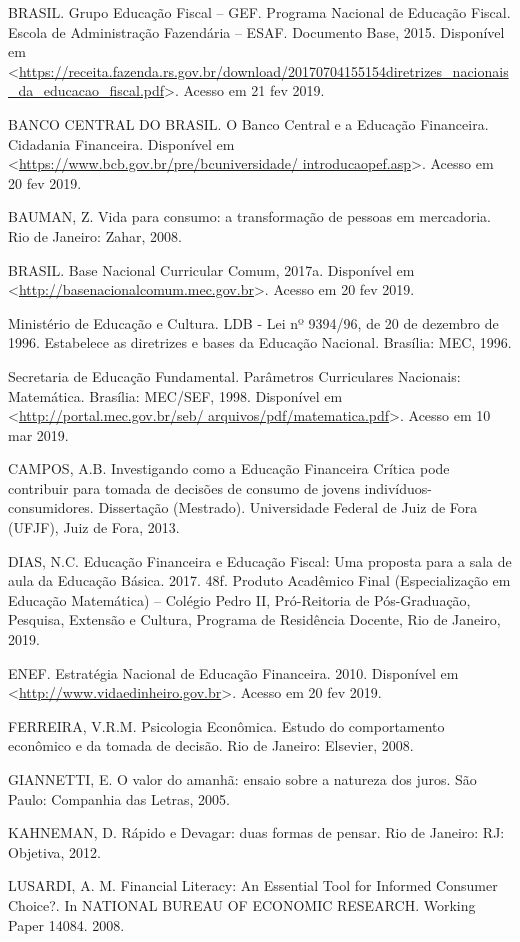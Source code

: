 BRASIL. Grupo Educação Fiscal – GEF. Programa Nacional de Educação Fiscal. Escola de Administração Fazendária – ESAF. Documento Base, 2015. Disponível em <\url{https://receita.fazenda.rs.gov.br/download/20170704155154diretrizes_nacionais_da_educacao_fiscal.pdf}>. Acesso em 21 fev 2019.

BANCO CENTRAL DO BRASIL. O Banco Central e a Educação Financeira. Cidadania Financeira. Disponível em <\url{https://www.bcb.gov.br/pre/bcuniversidade/ introducaopef.asp}>. Acesso em 20 fev 2019.

BAUMAN, Z. Vida para consumo: a transformação de pessoas em mercadoria. Rio de Janeiro: Zahar, 2008.

BRASIL. Base Nacional Curricular Comum, 2017a. Disponível em <\url{http://basenacionalcomum.mec.gov.br}>. Acesso em 20 fev 2019.

Ministério de Educação e Cultura. LDB - Lei nº 9394/96, de 20 de dezembro de 1996. Estabelece as diretrizes e bases da Educação Nacional. Brasília: MEC, 1996.

Secretaria de Educação Fundamental. Parâmetros Curriculares Nacionais: Matemática. Brasília: MEC/SEF, 1998. Disponível em <\url{http://portal.mec.gov.br/seb/ arquivos/pdf/matematica.pdf}>. Acesso em 10 mar 2019.

CAMPOS, A.B. Investigando como a Educação Financeira Crítica pode contribuir para tomada de decisões de consumo de jovens indivíduos-consumidores. Dissertação (Mestrado). Universidade Federal de Juiz de Fora (UFJF), Juiz de Fora, 2013.

DIAS, N.C. Educação Financeira e Educação Fiscal: Uma proposta para a sala de aula da Educação Básica. 2017. 48f. Produto Acadêmico Final (Especialização em Educação Matemática) – Colégio Pedro II, Pró-Reitoria de Pós-Graduação, Pesquisa, Extensão e Cultura, Programa de Residência Docente, Rio de Janeiro, 2019.

ENEF. Estratégia Nacional de Educação Financeira. 2010. Disponível em <\url{http://www.vidaedinheiro.gov.br}>. Acesso em 20 fev 2019.

FERREIRA, V.R.M. Psicologia Econômica. Estudo do comportamento econômico e da tomada de decisão. Rio de Janeiro: Elsevier, 2008.

GIANNETTI, E. O valor do amanhã: ensaio sobre a natureza dos juros. São Paulo: Companhia das Letras, 2005.

KAHNEMAN, D. Rápido e Devagar: duas formas de pensar. Rio de Janeiro: RJ: Objetiva, 2012.

LUSARDI, A. M. Financial Literacy: An Essential Tool for Informed Consumer Choice?. In NATIONAL BUREAU OF ECONOMIC RESEARCH. Working Paper 14084. 2008.

